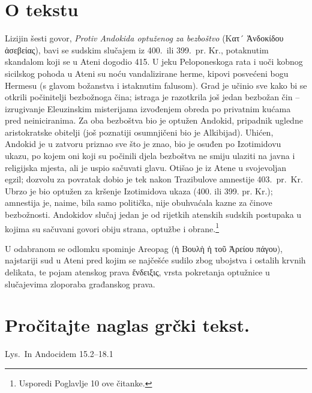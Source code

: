 
\section*{O tekstu}

Lizijin šesti govor, \textit{Protiv Andokida optuženog za bezboštvo} \textgreek{(Κατ´ Ἀνδοκίδου ἀσεβείας),} bavi se sudskim slučajem iz 400.\ ili 399.\ pr. Kr., potaknutim skandalom koji se u Ateni dogodio 415. U jeku Peloponeskoga rata i uoči kobnog sicilskog pohoda u Ateni su noću vandalizirane herme, kipovi posvećeni bogu Hermesu (s glavom božanstva i istaknutim falusom). Grad je učinio sve kako bi se otkrili počinitelji bezbožnoga čina; istraga je razotkrila još jedan bezbožan čin – izrugivanje Eleuzinskim misterijama izvođenjem obreda po privatnim kućama pred neiniciranima. Za oba bezboštva bio je optužen Andokid, pripadnik ugledne aristokratske obitelji (još poznatiji osumnjičeni bio je Alkibijad). Uhićen, Andokid je u zatvoru priznao sve što je znao, bio je osuđen po Izotimidovu ukazu, po kojem oni koji su počinili djela bezboštva ne smiju ulaziti na javna i religijska mjesta, ali je uspio sačuvati glavu. Otišao je iz Atene u svojevoljan egzil; dozvolu za povratak dobio je tek nakon Trazibulove amnestije 403.\ pr.~Kr. Ubrzo je bio optužen za kršenje Izotimidova ukaza (400. ili 399. pr. Kr.); amnestija je, naime, bila samo politička, nije obuhvaćala kazne za činove bezbožnosti. Andokidov slučaj jedan je od rijetkih atenskih sudskih postupaka u kojima su sačuvani govori obiju strana, optužbe i obrane.\footnote{Usporedi Poglavlje 10 ove čitanke.}

U odabranom se odlomku spominje Areopag \textgreek{(ἡ Βουλὴ ἡ τοῦ Ἀρείου πάγου),} najstariji sud u Ateni pred kojim se najčešće sudilo zbog ubojstva i ostalih krvnih delikata, te pojam atenskog prava \textgreek{ἔνδειξις,} vrsta pokretanja optužnice u slučajevima zloporaba građanskog prava. 



\section*{Pročitajte naglas grčki tekst.}

Lys.\ In Andocidem 15.2–18.1


\medskip



